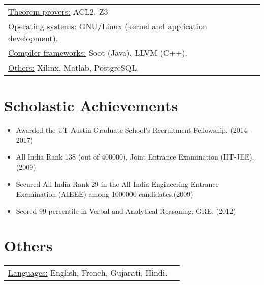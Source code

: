 \documentclass[margin]{res}
\begin{document}
\begin{resume}
\begin{tabular}{l p{3in}}
    \underline{Theorem provers:} ACL2, Z3 \\

    \underline{Operating systems:} GNU/Linux (kernel and application
    development). \\

    \underline{Compiler frameworks:} Soot (Java), LLVM (C++). \\

    \underline{Others:} Xilinx, Matlab, PostgreSQL. \\
 \end{tabular}

\section{Scholastic Achievements}
 \begin{itemize} \itemsep -2pt  %
 \item Awarded the UT Austin Graduate School's Recruitment
   Fellowship. \hfill (2014-2017)
 \item All India Rank 138 (out of 400000), Joint Entrance Examination
   (IIT-JEE). \hfill (2009)
 \item Secured All India Rank 29 in the All India Engineering Entrance
   Examination (AIEEE) among 1000000 candidates.\hfill (2009)
 \item Scored 99 percentile in Verbal and Analytical Reasoning,
   GRE. \hfill (2012)
 \end{itemize}

\section{Others}
\begin{tabular}{l p{3in}}
  \underline{Languages:} English, French, Gujarati, Hindi. \\
\end{tabular}

\end{resume} 
\end{document}
